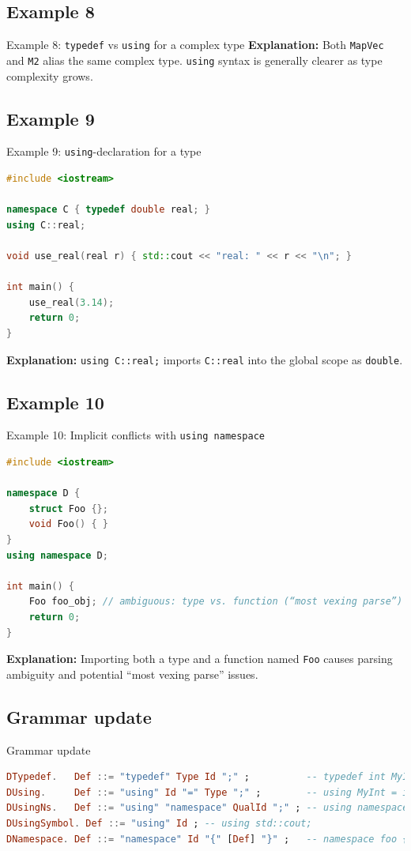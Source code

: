 \documentclass{beamer}
\begin{document}
\subsection{Example 8}
\begin{frame}[fragile]{Example 8: \texttt{typedef} vs \texttt{using} for a complex type}
\textbf{Explanation:}
Both \texttt{MapVec} and \texttt{M2} alias the same complex type. \texttt{using} syntax is generally clearer as type complexity grows.
\end{frame}
\subsection{Example 9}
\begin{frame}[fragile]{Example 9: \texttt{using}-declaration for a type}
\begin{lstlisting}[language=C++]
#include <iostream>

namespace C { typedef double real; }
using C::real;

void use_real(real r) { std::cout << "real: " << r << "\n"; }

int main() {
    use_real(3.14);
    return 0;
}
\end{lstlisting}
\textbf{Explanation:}
\texttt{using C::real;} imports \texttt{C::real} into the global scope as \texttt{double}.
\end{frame}
\subsection{Example 10}
\begin{frame}[fragile]{Example 10: Implicit conflicts with \texttt{using namespace}}
\begin{lstlisting}[language=C++]
#include <iostream>

namespace D {
    struct Foo {};
    void Foo() { }
}
using namespace D;

int main() {
    Foo foo_obj; // ambiguous: type vs. function (“most vexing parse”)
    return 0;
}
\end{lstlisting}
\textbf{Explanation:}
Importing both a type and a function named \texttt{Foo} causes parsing ambiguity and potential “most vexing parse” issues.
\end{frame}
\subsection{Grammar update}
\begin{frame}[fragile]{Grammar update}
\begin{lstlisting}[language=Haskell]
DTypedef.   Def ::= "typedef" Type Id ";" ;          -- typedef int MyInt;
DUsing.     Def ::= "using" Id "=" Type ";" ;        -- using MyInt = int;
DUsingNs.   Def ::= "using" "namespace" QualId ";" ; -- using namespace std;
DUsingSymbol. Def ::= "using" Id ; -- using std::cout;
DNamespace. Def ::= "namespace" Id "{" [Def] "}" ;   -- namespace foo { ... }
\end{lstlisting}
\end{frame}
\end{document}
